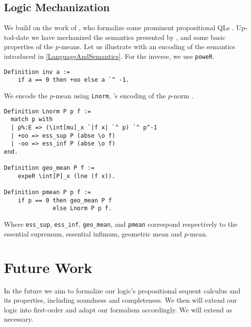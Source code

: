 \documentclass[sigplan, screen, review, nonacm]{acmart}
\begin{document}
\subsection{Logic Mechanization}
We build on the work of \citeauthor{affeldt2024taming}, who formalize some prominent propositional QLs \citep{affeldt2024taming}.  Up-tod-date we have mechanized the semantics presented by \citeauthor{capucci2024quantifiers} \cite{capucci2024quantifiers}, and some basic properties of the $p$-means. Let us illustrate with an encoding of the semantics introduced in \cref{LanguageAndSemantics}. For the inverse, we use \texttt{poweR}.
\begin{verbatim}
Definition inv a := 
    if a == 0 then +oo else a `^ -1.
\end{verbatim}
We encode the $p$-mean using \texttt{Lnorm}, \mathcomp{}'s encoding of the $p$-norm \cite{lpspaces}. 
\begin{verbatim}
Definition Lnorm P p f :=
  match p with
  | p%:E => (\int[mu]_x `|f x| `^ p) `^ p^-1
  | +oo => ess_sup P (abse \o f)
  | -oo => ess_inf P (abse \o f)
end.

Definition geo_mean P f :=  
    expeR \int[P]_x (lne (f x)). 

Definition pmean P p f := 
    if p == 0 then geo_mean P f 
              else Lnorm P p f.
\end{verbatim}

Where \texttt{ess\_sup}, \texttt{ess\_inf},  \texttt{geo\_mean}, and \texttt{pmean} correspond respectively to the essential supremum, essential infimum, geometric mean and $p$-mean.

\section{Future Work}
 In the future we aim to formalize our logic's propositional sequent calculus and its properties, including soundness and completeness. We then will extend our logic into first-order and adapt our formalism accordingly. We will extend \mathcomp{} as necessary.

\begin{comment}
\section{Acknowledgements}
J. Marulanda-Giraldo and E. Komendantskaya acknowledge the partial support of the EPSRC grant AISEC: AI Secure and Explainable by Construction (EP/T026960/1).
M. Capucci and E. Komendantskaya were supported by ARIA: Mathematics for Safe AI grant.
J. Marulanda-Giraldo received PhD Scholarship from the University of Southampton.
\end{comment}



\end{document}
